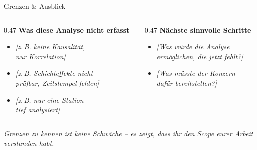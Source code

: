 \documentclass[aspectratio=169, 11pt]{beamer}
\newcommand{\hinweis}[1]{%
  \vspace{4pt}%
  {\scriptsize\color{mutedtext}\textit{#1}}%
}
\begin{document}
\begin{frame}{Grenzen \& Ausblick}

  \begin{columns}[T, onlytextwidth]
    \begin{column}{0.47\textwidth}
      \textbf{Was diese Analyse nicht erfasst}
      \begin{itemize}
        \item \textit{[z.\,B. keine Kausalität,\\
          nur Korrelation]}
        \item \textit{[z.\,B. Schichteffekte nicht\\
          prüfbar, Zeitstempel fehlen]}
        \item \textit{[z.\,B. nur eine Station\\
          tief analysiert]}
      \end{itemize}
    \end{column}

    \begin{column}{0.47\textwidth}
      \textbf{Nächste sinnvolle Schritte}
      \begin{itemize}
        \item \textit{[Was würde die Analyse\\
          ermöglichen, die jetzt fehlt?]}
        \item \textit{[Was müsste der Konzern\\
          dafür bereitstellen?]}
      \end{itemize}
    \end{column}
  \end{columns}

  \vspace{10pt}
  \hinweis{Grenzen zu kennen ist keine Schwäche --
  es zeigt, dass ihr den Scope eurer Arbeit verstanden habt.}

\end{frame}
\end{document}
